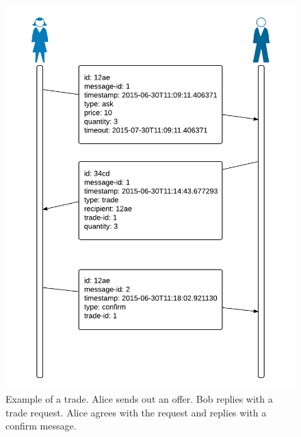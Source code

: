 \begin{figure}[H]
  \centering
  \includegraphics[width=\textwidth]{trade}
  \caption{Example of a trade. Alice sends out an offer. Bob replies with a trade request. Alice agrees with the request and replies with a confirm message.}
  \label{tradefig}
\end{figure}